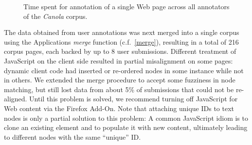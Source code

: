 \begin{figure}[h]
\centering
{}
\caption{
\label{f:userstats}
\label{ens1}
	Time spent for annotation of a single Web page across all annotators of the \textit{Canola} corpus.}
\end{figure}

The data obtained from user annotations was next merged into a single corpus using the Applications \textit{merge} function (c.f.~\ref{merge}), resulting in a total of 216 corpus pages, each backed by up to 8 user submissions.
Different treatment of JavaScript on the client side resulted in partial misalignment on some pages:
dynamic client code had inserted or re-ordered nodes in some instance while not in others.
We extended the merge procedure to accept some fuzziness in node matching, but still lost data from about 5\% of submissions that could not be re-aligned.
Until this problem is solved, we recommend turning off JavaScript for Web content via the Firefox Add-On.
Note that attaching unique IDs to text nodes is only a partial solution to this problem:
A common JavaScript idiom is to clone an existing element and to populate it with new content, ultimately leading to different nodes with the same ``unique'' ID. 

